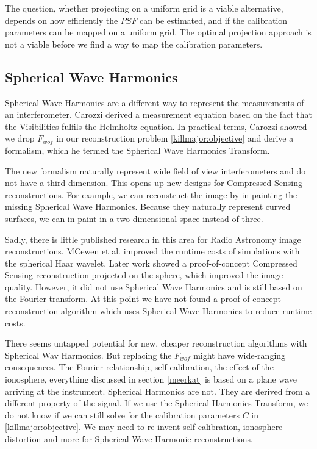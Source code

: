 The question, whether projecting on a uniform grid is a viable alternative, depends on how efficiently the $PSF$ can be estimated, and if the calibration parameters can be mapped on a uniform grid. The optimal projection approach is not a viable before we find a way to map the calibration parameters.


\subsection{Spherical Wave Harmonics}
Spherical Wave Harmonics are a different way to represent the measurements of an interferometer. Carozzi\cite{carozzi2015imaging} derived a measurement equation based on the fact that the Visibilities fulfils the Helmholtz equation. In practical terms, Carozzi showed we drop $F_{wof}$ in our reconstruction problem \eqref{killmajor:objective} and derive a formalism, which he termed the Spherical Wave Harmonics Transform. 

The new formalism naturally represent wide field of view interferometers and do not have a third dimension. This opens up new designs for Compressed Sensing reconstructions. For example, we can reconstruct the image by in-painting the missing Spherical Wave Harmonics. Because they naturally represent curved surfaces, we can in-paint in a two dimensional space instead of three.

Sadly, there is little published research in this area for Radio Astronomy image reconstructions. MCewen et al.\cite{mcewen2008simulating} improved the runtime costs of simulations with the spherical Haar wavelet. Later work\cite{mcewen2011compressed} showed a proof-of-concept Compressed Sensing reconstruction projected on the sphere, which improved the image quality. However, it did not use Spherical Wave Harmonics and \cite{mcewen2011compressed} is still based on the Fourier transform. At this point we have not found a proof-of-concept reconstruction algorithm which uses Spherical Wave Harmonics to reduce runtime costs. 

There seems untapped potential for new, cheaper reconstruction algorithms with Spherical Wav Harmonics. But replacing the $F_{wof}$ might have wide-ranging consequences. The Fourier relationship, self-calibration, the effect of the ionosphere, everything discussed in section \ref{meerkat} is based on a plane wave arriving at the instrument\cite{thompson1986interferometry, smirnov2011revisiting}. Spherical Harmonics are not. They are derived from a different property of the signal. If we use the Spherical Harmonics Transform, we do not know if we can still solve for the calibration parameters $C$ in \eqref{killmajor:objective}. We may need to re-invent self-calibration, ionosphere distortion and more for Spherical Wave Harmonic reconstructions.


